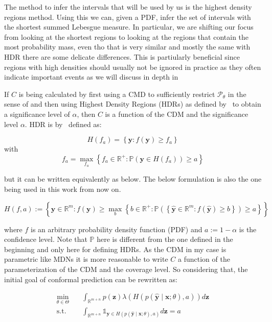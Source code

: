 The method to infer the intervals that will be used by us is the highest density regions method. Using this we can, given a PDF, infer the set of intervals with the shortest summed Lebesgue measure. In particular, we are shifting our focus from looking at the shortest regions to looking at the regions that contain the most probability mass, even tho that is very similar and mostly the same with HDR there are some delicate differences. This is partiularly beneficial since regions with high densities should usually not be ignored in practice as they often indicate important events as we will discuss in depth in 

If $C$ is being calculated by first using a CMD to sufficiently restrict $\mathscr{P}_\theta$ in the sense of  and then using Highest Density Regions (HDRs) as defined by~\cite{hyndman1996computing} to obtain a significance level of $\alpha$, then $C$ is a function of the CDM and the significance level $\alpha$. HDR is by~\cite{hyndman1996computing} defined as:

\[
    H\left(f_a\right)=\left\{\mathbf{y}: f(\mathbf{y}) \geq f_a\right\}
\]
with
\[
    f_a = \max_{f_a} \left\{f_a \in \mathbb{R^+}: \mathbb{P}\left(\mathbf{y}
    \in
    H(f_a)\right) \geq a \right\}
\]

but it can be written equivalently as below. The below formulation is also the one being used in this work from now on.

\begin{equation}
    H\left(f, a\right):=\left\{\mathbf{y} \in \mathbb{R}^m: f(\mathbf{y}) \geq
    \max_{b} \left\{b \in \mathbb{R^+}: \mathbb{P}\left(\left\{\mathbf{\hat{y}}
    \in
    \mathbb{R}^m: f(\mathbf{\hat{y}}) \geq b\right\}\right) \geq a
    \right\}\right\}
    \label{eq:HDR}
\end{equation}

where $f$ is an arbitrary probability density function (PDF) and $a := 1 - \alpha$ is the confidence level. Note that $\mathbb{P}$ here is different from the one defined in the beginning and only here for defining HDRs. As the CDM in my case is parametric like MDNs it is more reasonable to write $C$ a function of the parameterization of the CDM and the coverage level. So considering that, the initial goal of conformal prediction can be rewritten as:

\begin{align}
    \min_{\theta \in \Theta} \quad & \int_{\mathbb{R}^{m + n}} p(\mathbf{z})
    \lambda(H(p(\mathbf{\hat{y}} \mid \mathbf{x}; \theta), a))
    d\mathbf{z} \label{eq:optimal_cp_obj_func}
    \\
    \text{s.t.} \quad              & \int_{\mathbb{R}^{m + n}}
    \mathds{1}_{\mathbf{y} \in
    H(p(\mathbf{\hat{y}} \mid \mathbf{x}; \theta), a)} d\mathbf{z} = a
\end{align}


